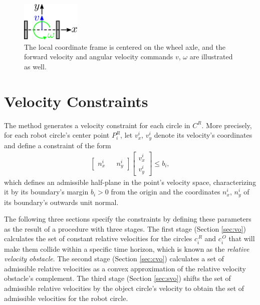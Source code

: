 \documentclass{article}
\begin{document}
\begin{figure}
	\begin{center}
		\includegraphics[width=0.25\textwidth]{kinematics.pdf}
	\end{center}
	\caption{The local coordinate frame is centered on the wheel axle, and the forward velocity and angular velocity commands $ v $, $ \omega $ are illustrated as well.}\label{fig:kinematics}
\end{figure}

\section{Velocity Constraints}

The method generates a velocity constraint for each circle in $ C^R $. More precisely, for each robot circle's center point $ P_i^R $, let $ v_x^i $, $ v_y^i $ denote its velocity's coordinates and define a constraint of the form
\begin{align}\label{eq:consRi}
\begin{bmatrix}
n_x^i && n_y^i
\end{bmatrix}
\begin{bmatrix}
v_x^i \\
v_y^i
\end{bmatrix} \leq  b_i ,
\end{align}
which defines an admissible half-plane in the point's velocity space, characterizing it by its boundary's margin $ b_i > 0 $ from the origin and the coordinates $ n_x^i $, $ n_y^i $ of its boundary's outwards unit normal.

The following three sections specify the constraints by defining these parameters as the result of a procedure with three stages. The first stage (Section \ref{sec:vo}) calculates the set of constant relative velocities for the circles $ c_i^{\,R} $ and $ c_i^{\,O} $ that will make them collide within a specific time horizon, which is known as the \textit{relative velocity obstacle}. The second stage (Section \ref{sec:cvo}) calculates a set of admissible relative velocities as a convex approximation of the relative velocity obstacle's complement. The third stage (Section \ref{sec:svo}) shifts the set of admissible relative velocities by the object circle's velocity to obtain the set of admissible velocities for the robot circle.
\end{document}
